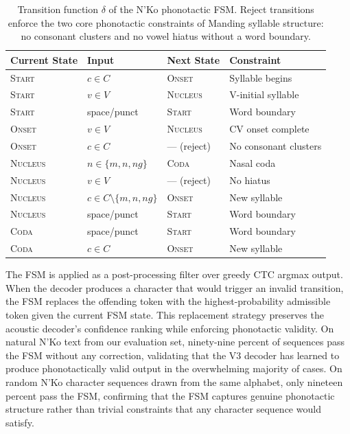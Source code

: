 \documentclass[11pt]{article}
\newcommand{\nko}{N'Ko}
\begin{document}
\begin{table}[ht]
\centering
\caption{Transition function $\delta$ of the \nko{} phonotactic FSM. Reject transitions enforce the two core phonotactic constraints of Manding syllable structure: no consonant clusters and no vowel hiatus without a word boundary.}
\label{tab:fsm}
\begin{tabular}{@{}llll@{}}
\toprule
Current State & Input & Next State & Constraint \\
\midrule
\textsc{Start} & $c \in C$ & \textsc{Onset} & Syllable begins \\
\textsc{Start} & $v \in V$ & \textsc{Nucleus} & V-initial syllable \\
\textsc{Start} & space/punct & \textsc{Start} & Word boundary \\
\textsc{Onset} & $v \in V$ & \textsc{Nucleus} & CV onset complete \\
\textsc{Onset} & $c \in C$ & --- (reject) & No consonant clusters \\
\textsc{Nucleus} & $n \in \{m, n, ng\}$ & \textsc{Coda} & Nasal coda \\
\textsc{Nucleus} & $v \in V$ & --- (reject) & No hiatus \\
\textsc{Nucleus} & $c \in C \setminus \{m,n,ng\}$ & \textsc{Onset} & New syllable \\
\textsc{Nucleus} & space/punct & \textsc{Start} & Word boundary \\
\textsc{Coda} & space/punct & \textsc{Start} & Word boundary \\
\textsc{Coda} & $c \in C$ & \textsc{Onset} & New syllable \\
\bottomrule
\end{tabular}
\end{table}

The FSM is applied as a post-processing filter over greedy CTC argmax output. When the decoder produces a character that would trigger an invalid transition, the FSM replaces the offending token with the highest-probability admissible token given the current FSM state. This replacement strategy preserves the acoustic decoder's confidence ranking while enforcing phonotactic validity. On natural \nko{} text from our evaluation set, ninety-nine percent of sequences pass the FSM without any correction, validating that the V3 decoder has learned to produce phonotactically valid output in the overwhelming majority of cases. On random \nko{} character sequences drawn from the same alphabet, only nineteen percent pass the FSM, confirming that the FSM captures genuine phonotactic structure rather than trivial constraints that any character sequence would satisfy.
\end{document}
